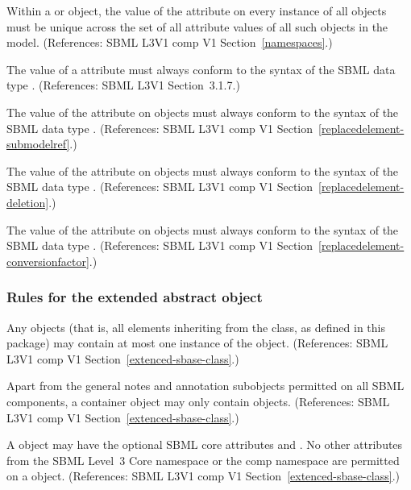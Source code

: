 \begin{sbmlenum}
 {  Within a \Model or \ExternalModelDefinition
  object, the value of the attribute  on every instance
  of all \Port objects must be unique across the set of all
   attribute values of all such objects in the model.
  (References: SBML L3V1 comp V1 Section~\ref{namespaces}.) }


 { The value of a  attribute must
  always conform to the syntax of the SBML data type .
  (References: SBML L3V1 Section~3.1.7.)}

  
 { The value of the  attribute on
  \ReplacedElement objects must always conform to the syntax of
  the SBML data type .
  (References: SBML L3V1 comp V1 Section~\ref{replacedelement-submodelref}.) }
 
  
 { The value of the  attribute on
  \ReplacedElement objects must always conform to the syntax of
  the SBML data type .
  (References: SBML L3V1 comp V1 Section~\ref{replacedelement-deletion}.) }

  
 { The value of the  attribute on
  \ReplacedElement objects must always conform to the syntax of
  the SBML data type .
  (References: SBML L3V1 comp V1 Section~\ref{replacedelement-conversionfactor}.) }
  

\end{sbmlenum} \subsubsection*{Rules for the extended  abstract object} \begin{sbmlenum}

 { Any \SBase objects (that is, all elements inheriting
  from the \SBase class, as defined in this package) may contain at most one 
  instance of the \ListOfReplacedElements object.
  (References: SBML L3V1 comp V1 Section~\ref{extenced-sbase-class}.) }


 { Apart from the general notes and annotation
  subobjects permitted on all SBML components, a \ListOfReplacedElements
  container object may only contain \ReplacedElement objects. 
  (References: SBML L3V1 comp V1 Section~\ref{extenced-sbase-class}.) }


 { A \ListOfReplacedElements object may have the optional 
  SBML core attributes  and .  No other attributes 
  from the SBML Level~3 Core namespace or the comp namespace are permitted on 
  a \ListOfReplacedElements object. 
  (References: SBML L3V1 comp V1 Section~\ref{extenced-sbase-class}.) }



\end{sbmlenum}
